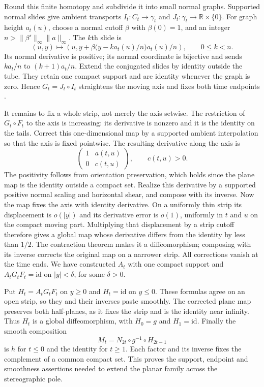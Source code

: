 Round this finite homotopy and subdivide it into small normal graphs.
Supported normal slides give ambient transports $I_t:C_t\to\gamma_t$
and $J_t:\gamma_t\to\mathbb R\times\{0\}$.  For graph height $a_t(u)$,
choose a normal cutoff $\beta$ with $\beta(0)=1$, and an integer
$n>\|\beta'\|_\infty\|a\|_\infty$.  The $k$th slide is
\[
 (u,y)\longmapsto
 \left(u,y+\beta\bigl(y-ka_t(u)/n\bigr)a_t(u)/n\right),
 \qquad 0\le k<n.
\]
Its normal derivative is positive; its normal coordinate is bijective
and sends $ka_t/n$ to $(k+1)a_t/n$.  Extend the conjugated slides by
identity outside the tube.  They retain one compact support and are
identity whenever the graph is zero.  Hence $G_t=J_t\circ I_t$
straightens the moving axis and fixes both time endpoints
\cite[Section 2.8, p.~197]{Munkres1960}.

It remains to fix a whole strip, not merely the axis setwise.
The restriction of $G_t\circ F_t$ to the axis is increasing: its
derivative is nonzero and it is the identity on the tails.  Correct this
one-dimensional map by a supported ambient interpolation so that the
axis is fixed pointwise.  The resulting derivative along the axis is
\[
 \begin{pmatrix}1&a(t,u)\\0&c(t,u)\end{pmatrix},\qquad c(t,u)>0.
\]
The positivity follows from orientation preservation, which holds since
the plane map is the identity outside a compact set.  Realize this
derivative by a supported positive normal scaling and horizontal shear,
and compose with its inverse.  Now the map fixes the axis with identity
derivative.  On a uniformly thin strip its displacement is $o(|y|)$
and its derivative error is $o(1)$, uniformly in $t$ and $u$ on the
compact moving part.  Multiplying that displacement by a strip cutoff
therefore gives a global map whose derivative differs from the identity
by less than $1/2$.  The contraction theorem makes it a diffeomorphism;
composing with its inverse corrects the original map on a narrower strip.
All corrections vanish at the time ends.  We have constructed $A_t$
with one compact support and
$A_tG_tF_t=\mathrm{id}$ on $|y|<\delta$, for some $\delta>0$.

Put $H_t=A_tG_tF_t$ on $y\ge0$ and $H_t=\mathrm{id}$ on $y\le0$.
These formulas agree on an open strip, so they and their inverses paste
smoothly.  The corrected plane map preserves both half-planes, as it fixes
the strip and is the identity near infinity.  Thus $H_t$ is a global
diffeomorphism, with $H_0=g$ and $H_1=\mathrm{id}$.  Finally the smooth
composition
\[
 M_t=N_{2t}\circ g^{-1}\circ H_{2t-1}
\]
is $h$ for $t\le0$ and the identity for $t\ge1$.  Each factor and
its inverse fixes the complement of a common compact set.  This proves
the support, endpoint and smoothness assertions needed to extend the
planar family across the stereographic pole.

